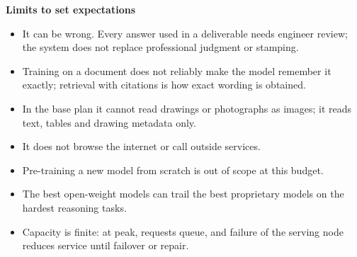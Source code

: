 \textbf{Limits to set expectations}
\begin{itemize}
  \item It can be wrong. Every answer used in a deliverable needs engineer review; the
    system does not replace professional judgment or stamping.
  \item Training on a document does not reliably make the model remember it exactly;
    retrieval with citations is how exact wording is obtained.
  \item In the base plan it cannot read drawings or photographs as images; it reads
    text, tables and drawing metadata only.
  \item It does not browse the internet or call outside services.
  \item Pre-training a new model from scratch is out of scope at this budget.
  \item The best open-weight models can trail the best proprietary models on the hardest
    reasoning tasks.
  \item Capacity is finite: at peak, requests queue, and failure of the serving node
    reduces service until failover or repair.
\end{itemize}
